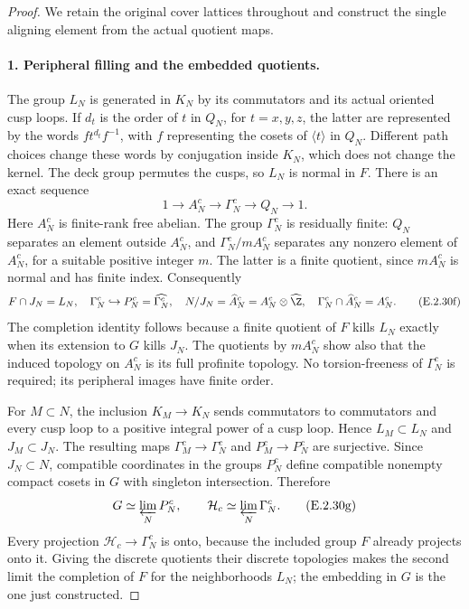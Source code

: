 \begin{proof}
We retain the original cover lattices throughout and construct
the single aligning element from the actual quotient maps.

\paragraph{1. Peripheral filling and the embedded quotients.}
The group \(L_N\) is generated in \(K_N\) by its commutators
and its actual oriented cusp loops. If \(d_t\) is the order of
\(t\) in \(Q_N\), for \(t=x,y,z\), the latter are represented
by the words \(f t^{d_t}f^{-1}\), with \(f\) representing the
cosets of \(\langle t\rangle\) in \(Q_N\). Different path
choices change these words by conjugation inside \(K_N\),
which does not change the kernel. The deck group permutes the
cusps, so \(L_N\) is normal in \(F\). There is an exact sequence
\[
 1\longrightarrow A_N^c\longrightarrow\Gamma_N^c
       \longrightarrow Q_N\longrightarrow1.
\tag{E.2.30e}
\]
Here \(A_N^c\) is finite-rank free abelian. The group
\(\Gamma_N^c\) is residually finite: \(Q_N\) separates an
element outside \(A_N^c\), and \(\Gamma_N^c/mA_N^c\)
separates any nonzero element of \(A_N^c\), for a suitable
positive integer \(m\). The latter is a finite quotient,
since \(mA_N^c\) is normal and has finite index.
Consequently
\[
 F\cap J_N=L_N,\quad
 \Gamma_N^c\hookrightarrow P_N^c=\widehat{\Gamma_N^c},\quad
 N/J_N=\widehat A_N^c=A_N^c\otimes\widehat\Z,\quad
 \Gamma_N^c\cap\widehat A_N^c=A_N^c.
\tag{E.2.30f}
\]
The completion identity follows because a finite quotient of
\(F\) kills \(L_N\) exactly when its extension to \(G\)
kills \(J_N\). The quotients by \(mA_N^c\) show also that
the induced topology on \(A_N^c\) is its full profinite
topology. No torsion-freeness of \(\Gamma_N^c\) is required;
its peripheral images have finite order.

For \(M\subset N\), the inclusion \(K_M\to K_N\) sends
commutators to commutators and every cusp loop to a positive
integral power of a cusp loop. Hence \(L_M\subset L_N\) and
\(J_M\subset J_N\). The resulting maps
\(\Gamma_M^c\to\Gamma_N^c\) and \(P_M^c\to P_N^c\)
are surjective. Since \(J_N\subset N\), compatible coordinates
in the groups \(P_N^c\) define compatible nonempty compact
cosets in \(G\) with singleton intersection. Therefore
\[
 G\simeq\varprojlim_NP_N^c,\qquad
 \mathcal H_c\simeq\varprojlim_N\Gamma_N^c.
\tag{E.2.30g}
\]
Every projection \(\mathcal H_c\to\Gamma_N^c\) is onto,
because the included group \(F\) already projects onto it.
Giving the discrete quotients their discrete topologies makes
the second limit the completion of \(F\) for the neighborhoods
\(L_N\); the embedding in \(G\) is the one just constructed.


\end{proof}
